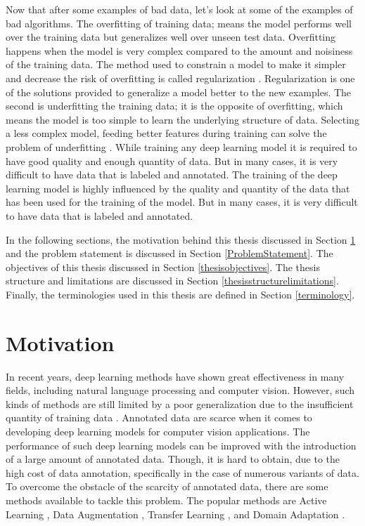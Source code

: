Now that after some examples of bad data, let's look at some of the examples of bad algorithms. The overfitting of training data; means the model performs well over the training data but generalizes well over unseen test data. Overfitting happens when the model is very complex compared to the amount and noisiness of the training data.  The method used to constrain a model to make it simpler and decrease the risk of overfitting is called regularization \cite{kukacka2017regularization}. Regularization is one of the solutions provided to generalize a model better to the new examples. The second is underfitting the training data; it is the opposite of overfitting, which means the model is too simple to learn the underlying structure of data. Selecting a less complex model, feeding better features during training can solve the problem of underfitting \cite{10.5555/3153997}. While training any deep learning model it is required to have good quality and enough quantity of data. But in many cases, it is very difficult to have data that is labeled and annotated. The training of the deep learning model is highly influenced by the quality and quantity of the data that has been used for the training of the model. But in many cases, it is very difficult to have data that is labeled and annotated. 


In the following sections, the motivation behind this thesis discussed in Section \ref{motivation} and the problem statement is discussed in Section \ref{ProblemStatement}. The objectives of this thesis discussed in Section \ref{thesisobjectives}. The thesis structure and limitations are discussed in Section \ref{thesisstructurelimitations}. Finally, the terminologies used in this thesis are defined in Section \ref{terminology}.



\section{Motivation}\label{motivation}

In recent years, deep learning methods have shown great effectiveness in many fields, including natural language processing and computer vision. However, such kinds of methods are still limited by a poor generalization due to the insufficient quantity of training data \cite{8978087}. Annotated data are scarce when it comes to developing deep learning models for computer vision applications. The performance of such deep learning models can be improved with the introduction of a large amount of annotated data. Though, it is hard to obtain, due to the high cost of data annotation, specifically in the case of numerous variants of data. To overcome the obstacle of the scarcity of annotated data, there are some methods available to tackle this problem. The popular methods are Active Learning \cite{hemmer2020deal}, Data Augmentation \cite{Shorten.2019}, Transfer Learning \cite{zhuang2020comprehensive}, and Domain Adaptation \cite{redko2020survey}. 

